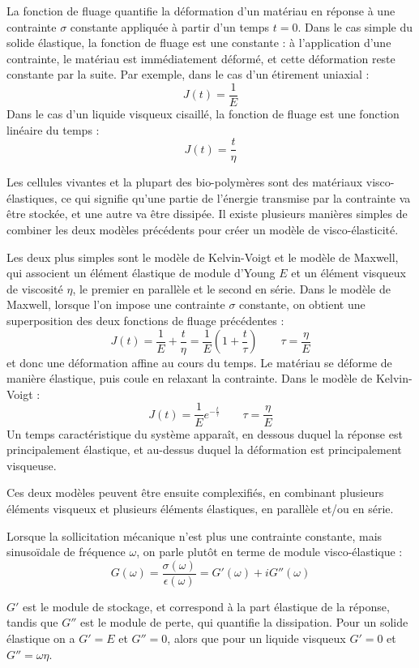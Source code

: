 \documentclass{report}
\begin{document}
La fonction de fluage quantifie la déformation d'un matériau en réponse à une contrainte $\sigma$ constante appliquée à partir d'un temps $t=0$. 
Dans le cas simple du solide élastique, la fonction de fluage est une constante : à l'application d'une contrainte, le matériau est immédiatement déformé, et cette déformation reste constante par la suite. Par exemple, dans le cas d'un étirement uniaxial : 
$$J(t)=\frac{1}{E}$$
Dans le cas d'un liquide visqueux cisaillé, la fonction de fluage est une fonction linéaire du temps : 
$$ J(t)=\frac{t}{\eta}$$

Les cellules vivantes et la plupart des bio-polymères sont des matériaux visco-élastiques, ce qui signifie qu'une partie de l'énergie transmise par la contrainte va être stockée, et une autre va être dissipée. Il existe plusieurs manières simples de combiner les deux modèles précédents pour créer un modèle de visco-élasticité. 

Les deux plus simples sont le modèle de Kelvin-Voigt et le modèle de Maxwell, qui associent un élément élastique de module d'Young $E$ et un élément visqueux de viscosité $\eta$, le premier en parallèle et le second en série. 
Dans le modèle de Maxwell, lorsque l'on impose une contrainte $\sigma$ constante, on obtient une superposition des deux fonctions de fluage précédentes : 
$$J(t)=\frac{1}{E} + \frac{t}{\eta} = \frac{1}{E} \left( 1 + \frac{t}{\tau} \right) \qquad \tau= \frac{\eta}{E}$$ 
et donc une déformation affine au cours du temps. Le matériau se déforme de manière élastique, puis coule en relaxant la contrainte. 
Dans le modèle de Kelvin-Voigt : 
$$ J(t)=\frac{1}{E} e^{-\frac{t}{\tau}} \qquad \tau=\frac{\eta}{E}$$
Un temps caractéristique du système apparaît, en dessous duquel la réponse est principalement élastique, et au-dessus duquel la déformation est principalement visqueuse. 

Ces deux modèles peuvent être ensuite complexifiés, en combinant plusieurs éléments visqueux et plusieurs éléments élastiques, en parallèle et/ou en série. 

Lorsque la sollicitation mécanique n'est plus une contrainte constante, mais sinusoïdale de fréquence $\omega$, on parle plutôt en terme de module visco-élastique : 
$$G(\omega) = \frac{\sigma(\omega)}{\epsilon(\omega)} = G'(\omega)+iG''(\omega)$$

$G'$ est le module de stockage, et correspond à la part élastique de la réponse, tandis que $G''$ est le module de perte, qui quantifie la dissipation. Pour un solide élastique on a $G'=E$ et $G''=0$, alors que pour un liquide visqueux $G'=0$ et $G''=\omega \eta$. 
\end{document}
